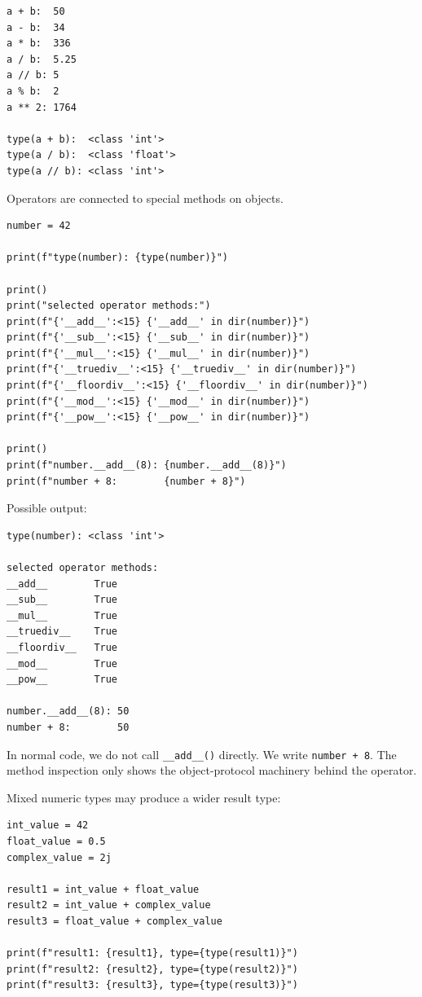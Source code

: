 \begin{verbatim}
a + b:  50
a - b:  34
a * b:  336
a / b:  5.25
a // b: 5
a % b:  2
a ** 2: 1764

type(a + b):  <class 'int'>
type(a / b):  <class 'float'>
type(a // b): <class 'int'>
\end{verbatim}

Operators are connected to special methods on objects.

\begin{verbatim}
number = 42

print(f"type(number): {type(number)}")

print()
print("selected operator methods:")
print(f"{'__add__':<15} {'__add__' in dir(number)}")
print(f"{'__sub__':<15} {'__sub__' in dir(number)}")
print(f"{'__mul__':<15} {'__mul__' in dir(number)}")
print(f"{'__truediv__':<15} {'__truediv__' in dir(number)}")
print(f"{'__floordiv__':<15} {'__floordiv__' in dir(number)}")
print(f"{'__mod__':<15} {'__mod__' in dir(number)}")
print(f"{'__pow__':<15} {'__pow__' in dir(number)}")

print()
print(f"number.__add__(8): {number.__add__(8)}")
print(f"number + 8:        {number + 8}")
\end{verbatim}

Possible output:

\begin{verbatim}
type(number): <class 'int'>

selected operator methods:
__add__        True
__sub__        True
__mul__        True
__truediv__    True
__floordiv__   True
__mod__        True
__pow__        True

number.__add__(8): 50
number + 8:        50
\end{verbatim}

In normal code, we do not call \texttt{\_\_add\_\_()} directly. We write \texttt{number + 8}. The method inspection only shows the object-protocol machinery behind the operator.

Mixed numeric types may produce a wider result type:

\begin{verbatim}
int_value = 42
float_value = 0.5
complex_value = 2j

result1 = int_value + float_value
result2 = int_value + complex_value
result3 = float_value + complex_value

print(f"result1: {result1}, type={type(result1)}")
print(f"result2: {result2}, type={type(result2)}")
print(f"result3: {result3}, type={type(result3)}")
\end{verbatim}

